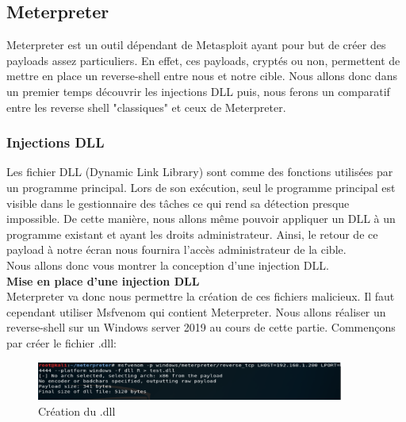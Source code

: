 \subsection{Meterpreter}

Meterpreter est un outil dépendant de Metasploit ayant pour but de créer des payloads assez particuliers. En effet, ces payloads, cryptés ou non, permettent de mettre en place un reverse-shell entre nous et notre cible. Nous allons donc dans un premier temps découvrir les injections DLL puis, nous ferons un comparatif entre les reverse shell "classiques" et ceux de Meterpreter.


\subsubsection{Injections DLL}

Les fichier DLL (Dynamic Link Library) sont comme des fonctions utilisées par un programme principal. Lors de son exécution, seul le programme principal est visible dans le gestionnaire des tâches ce qui rend sa détection presque impossible. De cette manière, nous allons même pouvoir appliquer un DLL à un programme existant et ayant les droits administrateur. Ainsi, le retour de ce payload à notre écran nous fournira l'accès administrateur de la cible.\\
Nous allons donc vous montrer la conception d'une injection DLL.\\

\noindent \textbf{Mise en place d'une injection DLL}\\

Meterpreter va donc nous permettre la création de ces fichiers malicieux. Il faut cependant utiliser Msfvenom qui contient Meterpreter. Nous allons réaliser un reverse-shell sur un Windows server 2019 au cours de cette partie. Commençons par créer le fichier .dll:

\begin{figure}[htp!]
  \centering
  \setlength\figureheight{7cm}
  \setlength\figurewidth{9cm}
  \includegraphics[width=0.9\textwidth]{oui/Ancien/imangeancien/meterpreter/msfvenom.PNG}
  \caption{Création du .dll}
  \label{fig:courbe-tikz}
\end{figure}

